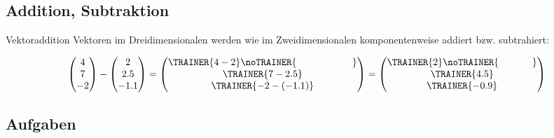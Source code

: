 \subsection{Addition, Subtraktion}
\begin{gesetz}{Vektoraddition}{}
  Vektoren im Dreidimensionalen werden wie im Zweidimensionalen
komponentenweise addiert bzw. subtrahiert:

$$\begin{pmatrix}4 \\ 7 \\ -2\end{pmatrix} - \begin{pmatrix}2 \\ 2.5  \\ -1.1\end{pmatrix} =
    \begin{pmatrix}\TRAINER{4-2}\noTRAINER{\hspace{20mm}} \\ \TRAINER{7-2.5} \\ \TRAINER{-2 - (-1.1)}\end{pmatrix}=
    \begin{pmatrix}\TRAINER{2}\noTRAINER{\hspace{12mm}}  \\ \TRAINER{4.5} \\ \TRAINER{-0.9}\end{pmatrix}$$
\end{gesetz}

\subsection*{Aufgaben}
